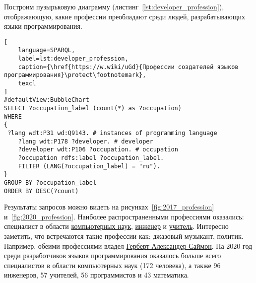 \begin{marginfigure}[-302pt]
{
\setlength{\fboxsep}{0pt}
\setlength{\fboxrule}{1pt}
}
  \caption{Профессии людей, которые разрабатывают языки программирования (2017).}
  \label{fig:2017_profession}
\end{marginfigure}
\begin{marginfigure}[-52pt]
{
\setlength{\fboxsep}{0pt}
\setlength{\fboxrule}{1pt}
}
  \caption{Профессии людей, которые разрабатывают языки программирования (2020).}
  \label{fig:2020_profession}
\end{marginfigure}
Построим пузырьковую диаграмму (листинг~\ref{lst:developer_profession}), отображающую, какие профессии преобладают среди людей, разрабатывающих языки программирования.
\begin{lstlisting}[
	language=SPARQL,
	label=lst:developer_profession,
	caption={\href{https://w.wiki/uGd}{Профессии создателей языков программирования}\protect\footnotemark},
	texcl
]
#defaultView:BubbleChart
SELECT ?occupation_label (count(*) as ?occupation)
WHERE
{
 ?lang wdt:P31 wd:Q9143. # instances of programming language 
 	?lang wdt:P178 ?developer. # developer
 	?developer wdt:P106 ?occupation. # occupation
 	?occupation rdfs:label ?occupation_label. 
 	FILTER (LANG(?occupation_label) = "ru"). 
}
GROUP BY ?occupation_label 
ORDER BY DESC(?count)
\end{lstlisting}


Результаты запросов можно видеть на рисунках~\ref{fig:2017_profession} и~\ref{fig:2020_profession}.
Наиболее распространенными профессиями оказались: специалист в области \href{https://www.wikidata.org/wiki/Q21198}{компьютерных наук}, \href{https://www.wikidata.org/wiki/Q81096}{инженер} и \href{https://www.wikidata.org/wiki/Q37226}{учитель}. Интересно заметить, что встречаются такие профессии как: джазовый музыкант, политик. Например, обеими профессиями владел \href{https://www.wikidata.org/wiki/Q181529}{Герберт Александер Саймон}. На 2020 год среди разработчиков языков программирования оказалось больше всего специалистов в области компьютерных наук (172 человека), а также 96 инженеров, 57 учителей, 56 программистов и 43 математика.

